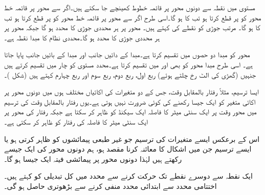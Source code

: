 مستوی میں نقطہ  سے دونوں محور پر قائمہ خطوط کھینچے جا سکتے ہیں۔اگر  سے  محور پر قائمہ خط  محور کو  پر قطع کرتا ہو تب  کا   ہو گا۔اسی طرح اگر  سے  محور پر قائمہ خط  محور کو  پر قطع کرتا ہو تب  کا   ہو گا۔  مرتب جوڑی  کو نقطے کی  کہتے ہیں۔ محور پر ہر محددی جوڑی کا  محدد  ہو گا جبکہ  محور پر ہر محددی جوڑی کا  محدد  ہو گا۔محددی نظام کا مبدا نقطہ  ہے۔ 

محور   کو مبدا دو حصوں میں تقسیم کرتا ہے۔مبدا کے دائیں جانب  اور مبدا کے بائیں جانب  پایا جاتا ہے۔ اسی طرح مبدا  محور کو بھی  اور  میں تقسیم کرتا ہے۔محدد مستوی کو چار  میں تقسیم کرتے ہیں جنہیں (گھڑی کی الٹ رخ چلتے ہوئے) ربع اول، ربع دوم، ربع سوم اور ربع چہارم کہتے ہیں (شکل )۔

ایسا ترسیم، مثلاً رفتار بالمقابل وقت، جس کے دو متغیرات کی اکائیاں مختلف ہوں میں دونوں محور پر اکائی متغیر کو ایک جیسا رکھنے کی کوئی ضرورت نہیں ہوتی ہے۔یوں رفتار بالمقابل وقت کی ترسیم میں محور وقت پر ایک سنٹی میٹر کا فاصلہ ایک سیکنڈ کو ظاہر کر سکتا ہے جبکہ رفتار کی محور پر ایک سنٹی میٹر کا فاصلہ  کی رفتار کو ظاہر کر سکتی ہے۔

اس کے برعکس ایسے متغیرات کی ترسیم جو غیر طبعی پیمائشوں کو ظاہر کرتی ہو یا ایسے ترسیم جن میں اشکال کا معائنہ کرنا مقصد ہو، ہم دونوں محور کی  ایک جیسے رکھتے ہیں لہٰذا دونوں محور پر پیمائشی فیتہ ایک جیسا ہو گا۔

ایک نقطہ سے دوسرے نقطے تک حرکت کرنے سے محدد میں کل تبدیلی کو  کہتے ہیں۔ اختتامی محدد سے ابتدائی محدد منفی کرنے سے بڑھوتری حاصل ہو گی۔

